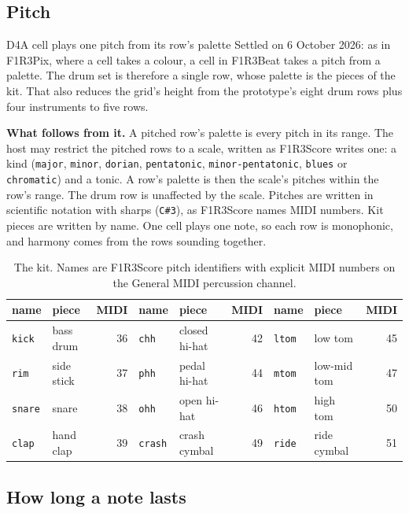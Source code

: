 \documentclass[11pt,a4paper]{article}
\newcommand{\code}[1]{\texttt{#1}}
\begin{document}
\subsection{Pitch}

\begin{settled}{D4}{A cell plays one pitch from its row's palette}
Settled on 6 October 2026: as in F1R3Pix, where a cell takes a colour, a cell in F1R3Beat takes
a pitch from a palette. The drum set is therefore a single row, whose palette is the pieces of
the kit. That also reduces the grid's height from the prototype's eight drum rows plus four
instruments to five rows.

\textbf{What follows from it.} A pitched row's palette is every pitch in its range. The host may restrict the pitched rows to a scale, written as F1R3Score writes
one: a kind (\code{major}, \code{minor}, \code{dorian}, \code{pentatonic},
\code{minor-pentatonic}, \code{blues} or \code{chromatic}) and a tonic. A row's palette is then
the scale's pitches within the row's range. The drum row is unaffected by the scale. Pitches
are written in scientific notation with sharps (\code{C\#3}), as F1R3Score names MIDI numbers.
Kit pieces are written by name. One cell plays one note, so each row is monophonic, and harmony
comes from the rows sounding together.
\end{settled}

\begin{table}[h]
\centering\small
\begin{tabular}{@{}llr@{\qquad}llr@{\qquad}llr@{}}
\toprule
name & piece & MIDI & name & piece & MIDI & name & piece & MIDI\\
\midrule
\code{kick}  & bass drum   & 36 & \code{chh}  & closed hi-hat & 42 & \code{ltom}  & low tom      & 45\\
\code{rim}   & side stick  & 37 & \code{phh}  & pedal hi-hat  & 44 & \code{mtom}  & low-mid tom  & 47\\
\code{snare} & snare       & 38 & \code{ohh}  & open hi-hat   & 46 & \code{htom}  & high tom     & 50\\
\code{clap}  & hand clap   & 39 & \code{crash}& crash cymbal  & 49 & \code{ride}  & ride cymbal  & 51\\
\bottomrule
\end{tabular}
\caption{The kit. Names are F1R3Score pitch identifiers with explicit MIDI numbers on the
General MIDI percussion channel.}
\label{tab:kit}
\end{table}

\subsection{How long a note lasts}
\end{document}
